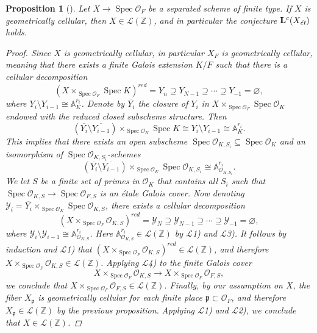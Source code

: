 \documentclass{article}
\DeclareMathOperator{\Spec}{Spec}
\newcommand{\ZZ}{\mathbb{Z}}
\renewcommand{\AA}{\mathbb{A}}
\renewcommand{\emptyset}{\varnothing}
\newcommand{\et}{\text{\it ét}}
\newtheorem{proposition}[theorem]{Proposition}
\theoremstyle{definition}
\numberwithin{equation}{section}
\begin{document}
\begin{proposition}[{\cite[Proposition~5.14]{Morin-2014}}]
  Let $X \to \Spec \mathcal{O}_F$ be a separated scheme of finite type.
  If $X$ is geometrically cellular, then $X \in \mathcal{L} (\ZZ)$,
  and in particular the conjecture $\mathbf{L}^c (X_\et)$ holds.

  \begin{proof}
    Since $X$ is geometrically cellular, in particular $X_F$ is geometrically
    cellular, meaning that there exists a finite Galois extension $K/F$ such
    that there is a cellular decomposition
    $$(X \times_{\Spec \mathcal{O}_F} \Spec K)^{red} = Y_n \supseteq Y_{N-1} \supseteq \cdots \supseteq Y_{-1} = \emptyset,$$
    where $Y_i\setminus Y_{i-1} \cong \AA^{r_i}_K$. Denote by $\overline{Y_i}$
    the closure of $Y_i$ in $X\times_{\Spec \mathcal{O}_F} \Spec \mathcal{O}_K$ endowed with
    the reduced closed subscheme structure. Then
    $$(\overline{Y_i}\setminus \overline{Y_{i-1}}) \times_{\Spec \mathcal{O}_K} \Spec K \cong Y_i \setminus Y_{i-1} \cong \AA^{r_i}_K.$$
    This implies that there exists an open subscheme
    $\Spec \mathcal{O}_{K,S_i} \subseteq \Spec \mathcal{O}_K$ and an isomorphism
    of $\Spec \mathcal{O}_{K,S_i}$-schemes
    $$(\overline{Y_i}\setminus \overline{Y_{i-1}}) \times_{\Spec \mathcal{O}_K} \Spec \mathcal{O}_{K,S_i} \cong \AA^{r_i}_{\mathcal{O}_{K,S_i}}.$$
    We let $S$ be a finite set of primes in $\mathcal{O}_K$ that contains all
    $S_i$ such that $\Spec \mathcal{O}_{K,S} \to \Spec \mathcal{O}_{F,S}$ is an
    étale Galois cover. Now denoting
    $\mathcal{Y}_i = \overline{Y_i} \times_{\Spec \mathcal{O}_K} \Spec \mathcal{O}_{K,S}$,
    there exists a cellular decomposition
    $$(X \times_{\Spec \mathcal{O}_F} \mathcal{O}_{K,S})^{red} = \mathcal{Y}_N \supseteq \mathcal{Y}_{N-1} \supseteq \cdots \supseteq \mathcal{Y}_{-1} = \emptyset,$$
    where
    $\mathcal{Y}_i \setminus \mathcal{Y}_{i-1} \cong \AA^{r_i}_{\mathcal{O}_{K,S}}$.
    Here $\AA^{r_i}_{\mathcal{O}_{K,S}} \in \mathcal{L} (\ZZ)$ by
    $\mathcal{L}$1) and $\mathcal{L}$3). It follows by induction and
    $\mathcal{L}$1) that
    $(X \times_{\Spec \mathcal{O}_F} \mathcal{O}_{K,S})^{red} \in \mathcal{L} (\ZZ)$,
    and therefore $X \times_{\Spec \mathcal{O}_F} \mathcal{O}_{K,S} \in \mathcal{L} (\ZZ)$.
    Applying $\mathcal{L}$4) to the finite Galois cover
    $$X \times_{\Spec \mathcal{O}_F} \mathcal{O}_{K,S} \to X \times_{\Spec \mathcal{O}_F} \mathcal{O}_{F,S},$$
    we conclude that
    $X \times_{\Spec \mathcal{O}_F} \mathcal{O}_{F,S} \in \mathcal{L} (\ZZ)$.
    Finally, by our assumption on $X$, the fiber $X_\mathfrak{p}$ is
    geometrically cellular for each finite place
    $\mathfrak{p} \subset \mathcal{O}_F$, and therefore
    $X_\mathfrak{p} \in \mathcal{L} (\ZZ)$ by the previous proposition.
    Applying $\mathcal{L}$1) and $\mathcal{L}$2), we conclude that
    $X \in \mathcal{L} (\ZZ)$.
  \end{proof}
\end{proposition}
\end{document}

